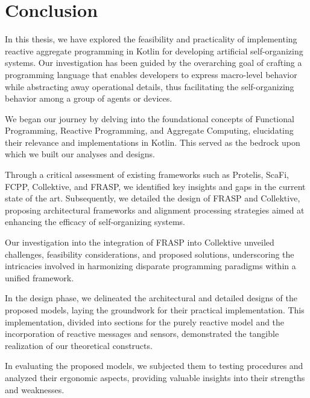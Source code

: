 
\chapter{Conclusion}
\label{chap:conclusion}

In this thesis, we have explored the feasibility and practicality of implementing reactive aggregate programming in Kotlin for developing artificial self-organizing systems. Our investigation has been guided by the overarching goal of crafting a programming language that enables developers to express macro-level behavior while abstracting away operational details, thus facilitating the self-organizing behavior among a group of agents or devices.

We began our journey by delving into the foundational concepts of Functional Programming, Reactive Programming, and Aggregate Computing, elucidating their relevance and implementations in Kotlin. This served as the bedrock upon which we built our analyses and designs.

Through a critical assessment of existing frameworks such as Protelis, ScaFi, FCPP, Collektive, and FRASP, we identified key insights and gaps in the current state of the art. Subsequently, we detailed the design of FRASP and Collektive, proposing architectural frameworks and alignment processing strategies aimed at enhancing the efficacy of self-organizing systems.

Our investigation into the integration of FRASP into Collektive unveiled challenges, feasibility considerations, and proposed solutions, underscoring the intricacies involved in harmonizing disparate programming paradigms within a unified framework.

In the design phase, we delineated the architectural and detailed designs of the proposed models, laying the groundwork for their practical implementation. This implementation, divided into sections for the purely reactive model and the incorporation of reactive messages and sensors, demonstrated the tangible realization of our theoretical constructs.

In evaluating the proposed models, we subjected them to testing procedures and analyzed their ergonomic aspects, providing valuable insights into their strengths and weaknesses.

